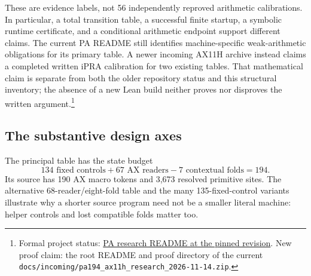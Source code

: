 These are evidence labels, not 56 independently reproved arithmetic
calibrations. In particular, a total transition table, a successful finite
startup, a symbolic runtime certificate, and a conditional arithmetic
endpoint support different claims. The current PA README still identifies
machine-specific weak-arithmetic obligations for its primary table. A
newer incoming AX11H archive instead claims a completed written iPRA
calibration for two existing tables. That mathematical claim is separate
from both the older repository status and this structural inventory; the
absence of a new Lean build neither proves nor disproves the written
argument.\footnote{Formal project status:
\href{https://github.com/VladimirReshetnikov/ProveIt/blob/1e1a41f799d4658b829cdd0eabae3775a0c8c4a0/Computability/BusyBeaver/Research/PA/README.md}{PA research README at the pinned revision}.
New proof claim: the root README and proof directory of the current
\texttt{docs/incoming/pa194\_ax11h\_research\_2026-11-14.zip}.}

\subsection{The substantive design axes}

The principal table has the state budget
\[
134\text{ fixed controls}+67\text{ AX readers}-7\text{ contextual folds}=194.
\]
Its source has 190 AX macro tokens and 3,673 resolved primitive sites. The
alternative 68-reader/eight-fold table and the many 135-fixed-control
variants illustrate why a shorter source program need not be a smaller
literal machine: helper controls and lost compatible folds matter too.

